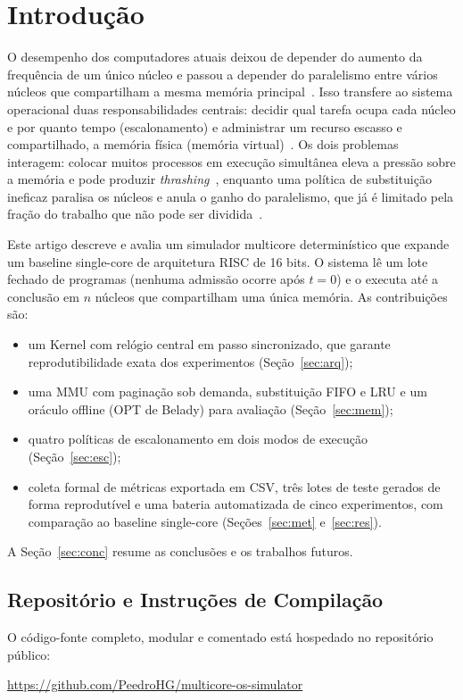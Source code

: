 \documentclass[conference]{IEEEtran}
\begin{document}
\section{Introdução}
\label{sec:intro}
O desempenho dos computadores atuais deixou de depender do aumento da frequência de um único núcleo e passou a depender do paralelismo entre vários núcleos que compartilham a mesma memória principal~\cite{hennessy2017}. Isso transfere ao sistema operacional duas responsabilidades centrais: decidir qual tarefa ocupa cada núcleo e por quanto tempo (escalonamento) e administrar um recurso escasso e compartilhado, a memória física (memória virtual)~\cite{tanenbaum2015,silberschatz2018}. Os dois problemas interagem: colocar muitos processos em execução simultânea eleva a pressão sobre a memória e pode produzir \textit{thrashing}~\cite{denning1968}, enquanto uma política de substituição ineficaz paralisa os núcleos e anula o ganho do paralelismo, que já é limitado pela fração do trabalho que não pode ser dividida~\cite{amdahl1967}.

Este artigo descreve e avalia um simulador multicore determinístico que expande um baseline single-core de arquitetura RISC de 16 bits. O sistema lê um lote fechado de programas (nenhuma admissão ocorre após $t = 0$) e o executa até a conclusão em $n$ núcleos que compartilham uma única memória. As contribuições são:
\begin{itemize}
    \item um Kernel com relógio central em passo sincronizado, que garante reprodutibilidade exata dos experimentos (Seção~\ref{sec:arq});
    \item uma MMU com paginação sob demanda, substituição FIFO e LRU e um oráculo offline (OPT de Belady) para avaliação (Seção~\ref{sec:mem});
    \item quatro políticas de escalonamento em dois modos de execução (Seção~\ref{sec:esc});
    \item coleta formal de métricas exportada em CSV, três lotes de teste gerados de forma reprodutível e uma bateria automatizada de cinco experimentos, com comparação ao baseline single-core (Seções~\ref{sec:met} e~\ref{sec:res}).
\end{itemize}
A Seção~\ref{sec:conc} resume as conclusões e os trabalhos futuros.

\subsection{Repositório e Instruções de Compilação}
O código-fonte completo, modular e comentado está hospedado no repositório público:\\
\centerline{\url{https://github.com/PeedroHG/multicore-os-simulator}}
\end{document}
